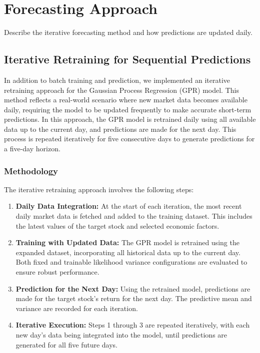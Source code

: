 \section{Forecasting Approach}
Describe the iterative forecasting method and how predictions are updated daily.

\subsection{Iterative Retraining for Sequential Predictions}

In addition to batch training and prediction, we implemented an iterative retraining approach for the Gaussian Process Regression (GPR) model. This method reflects a real-world scenario where new market data becomes available daily, requiring the model to be updated frequently to make accurate short-term predictions. In this approach, the GPR model is retrained daily using all available data up to the current day, and predictions are made for the next day. This process is repeated iteratively for five consecutive days to generate predictions for a five-day horizon.

\subsubsection{Methodology}

The iterative retraining approach involves the following steps:

\begin{enumerate}
    \item \textbf{Daily Data Integration:} At the start of each iteration, the most recent daily market data is fetched and added to the training dataset. This includes the latest values of the target stock and selected economic factors.
    \item \textbf{Training with Updated Data:} The GPR model is retrained using the expanded dataset, incorporating all historical data up to the current day. Both fixed and trainable likelihood variance configurations are evaluated to ensure robust performance.
    \item \textbf{Prediction for the Next Day:} Using the retrained model, predictions are made for the target stock's return for the next day. The predictive mean and variance are recorded for each iteration.
    \item \textbf{Iterative Execution:} Steps 1 through 3 are repeated iteratively, with each new day’s data being integrated into the model, until predictions are generated for all five future days.
\end{enumerate}

